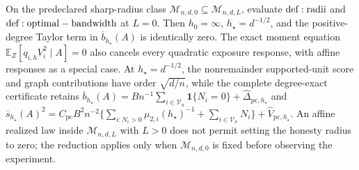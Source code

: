 On the predeclared sharp-radius class \(\mathcal M_{n,d,0}\subseteq\mathcal M_{n,d,L}\), evaluate \({\rm def:radii}\) and \({\rm def:optimal-bandwidth}\) at \(L=0\). Then \(h_0=\infty\), \(h_\star=d^{-1/2}\), and the positive-degree Taylor term in \(\overline b_{h_\star}(A)\) is identically zero. The exact moment equation \(\mathbb E_Z[q_{i,h}V_i^2\mid A]=0\) also cancels every quadratic exposure response, with affine responses as a special case. At \(h_\star=d^{-1/2}\), the nonremainder supported-unit score and graph contributions have order \(\sqrt{d/n}\), while the complete degree-exact certificate retains \(\overline b_{h_\star}(A)=Bn^{-1}\sum_{i\in\mathcal V_n}\mathbf 1\{N_i=0\}+\widehat\Delta_{\mathrm{pc},h_\star}\) and \(\overline s_{h_\star}(A)^2=C_{\mathrm{pc}}B^2n^{-2}\{\sum_{i:N_i>0}\mu_{2,i}(h_\star)^{-1}+\sum_{i\in\mathcal V_n}N_i\}+\widehat V_{\mathrm{pc},h_\star}\). An affine realized law inside \(\mathcal M_{n,d,L}\) with \(L>0\) does not permit setting the honesty radius to zero; the reduction applies only when \(\mathcal M_{n,d,0}\) is fixed before observing the experiment.